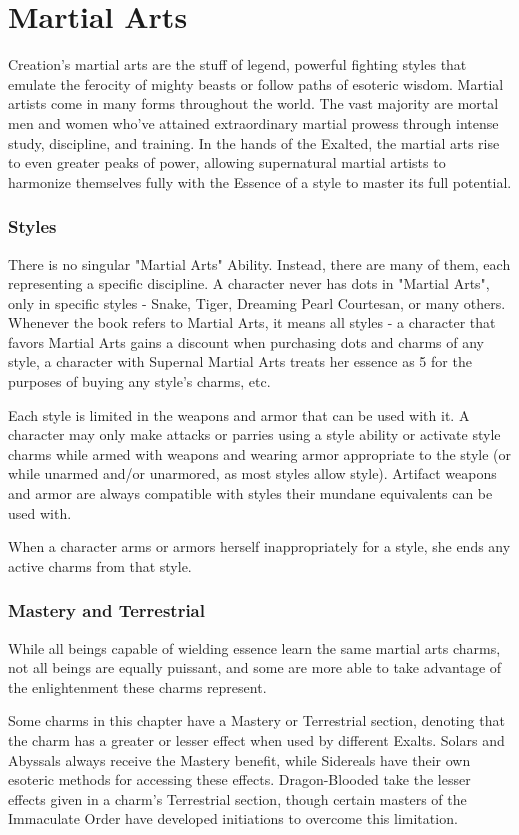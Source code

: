 \documentclass[oneside]{book}
\begin{document}
\chapter{Martial Arts}
\begin{multicols}{2}
Creation's martial arts are the stuff of legend, powerful fighting styles that emulate the ferocity of mighty beasts or follow paths of esoteric wisdom. Martial artists come in many forms throughout the world. The vast majority are mortal men and women who've attained extraordinary martial prowess through intense study, discipline, and training. In the hands of the Exalted, the martial arts rise to even greater peaks of power, allowing supernatural martial artists to harmonize themselves fully with the Essence of a style to master its full potential.

\subsection*{Styles}
  There is no singular "Martial Arts" Ability. Instead, there are many of them, each representing a specific discipline. A character never has dots in "Martial Arts", only in specific styles - Snake, Tiger, Dreaming Pearl Courtesan, or many others. Whenever the book refers to Martial Arts, it means all styles - a character that favors Martial Arts gains a discount when purchasing dots and charms of any style, a character with Supernal Martial Arts treats her essence as 5 for the purposes of buying any style's charms, etc.

  Each style is limited in the weapons and armor that can be used with it. A character may only make attacks or parries using a style ability or activate style charms while armed with weapons and wearing armor appropriate to the style (or while unarmed and/or unarmored, as most styles allow style). Artifact weapons and armor are always compatible with styles their mundane equivalents can be used with.

  \par When a character arms or armors herself inappropriately for a style, she ends any active charms from that style.

\subsection*{Mastery and Terrestrial}
  While all beings capable of wielding essence learn the same martial arts charms, not all beings are equally puissant, and some are more able to take advantage of the enlightenment these charms represent.

  Some charms in this chapter have a Mastery or Terrestrial section, denoting that the charm has a greater or lesser effect when used by different Exalts. Solars and Abyssals always receive the Mastery benefit, while Sidereals have their own esoteric methods for accessing these effects. Dragon-Blooded take the lesser effects given in a charm's Terrestrial section, though certain masters of the Immaculate Order have developed initiations to overcome this limitation.

\end{multicols}
\end{document}
